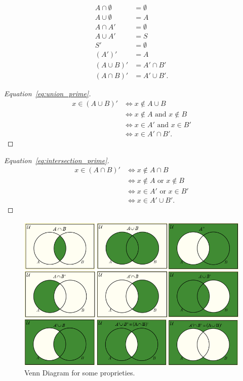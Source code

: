 \documentclass{article}
\begin{document}
\begin{align}
    A \cap \emptyset &= \emptyset \\
    A \cup \emptyset &= A \\
    A \cap A' &= \emptyset \\
    A \cup A' &= S \\
    S' &= \emptyset \\
    (A')' &= A \\
    (A \cup B)' &= A' \cap B' \label{eq:union_prime} \\
    (A \cap B)' &= A' \cup B' \label{eq:intersection_prime}
.\end{align}


\begin{proof}[Equation~\ref{eq:union_prime}]
\begin{align*}
    x \in (A \cup B)' &\iff x \notin A \cup B \\
    &\iff x \notin A \text{ and } x \notin B \\
    &\iff x \in A' \text{ and } x \in B' \\
    &\iff x \in A' \cap B'.
\end{align*}
\end{proof}

\begin{proof}[Equation~\ref{eq:intersection_prime}]
\begin{align*}
    x \in (A \cap B)' &\iff x \notin A \cap B \\
    &\iff x \notin A \text{ or } x \notin B \\
    &\iff x \in A' \text{ or } x \in B' \\
    &\iff x \in A' \cup B'.
\end{align*}
\end{proof}

\begin{figure}[htbp]
  \begin{fullpage}
    \includegraphics[width=\textwidth]{images/20250108_003400.png}
    \caption{Venn Diagram for some proprieties.}
    \label{fig:venn_properties}
  \end{fullpage}
\end{figure}
\end{document}
